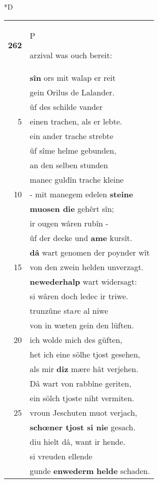 \documentclass[8pt,a4paper,notitlepage]{article}
\begin{document}
\begin{table}[ht]
\begin{minipage}[t]{0.5\linewidth}
\small
\begin{center}*D
\end{center}
\begin{tabular}{rl}
\textbf{262} & \begin{large}P\end{large}arzival was ouch bereit:\\ 
 & \textbf{sîn} ors mit walap er reit\\ 
 & gein Orilus de Lalander.\\ 
 & ûf des schilde vander\\ 
5 & einen trachen, als er lebte.\\ 
 & ein ander trache strebte\\ 
 & ûf sîme helme gebunden,\\ 
 & an den selben stunden\\ 
 & manec guldîn trache kleine\\ 
10 & - mit manegem edelen \textbf{steine}\\ 
 & \textbf{muosen die} gehêrt sîn;\\ 
 & ir ougen wâren rubîn -\\ 
 & ûf der decke und \textbf{ame} kursît.\\ 
 & \textbf{dâ} wart genomen der poynder wît\\ 
15 & von den zwein helden unverzagt.\\ 
 & \textbf{newederhalp} wart widersagt:\\ 
 & si wâren doch ledec ir triwe.\\ 
 & trunzûne sta\textit{r}c al niwe\\ 
 & von in wæten gein den lüften.\\ 
20 & ich wolde mich des güften,\\ 
 & het ich eine sölhe tjost gesehen,\\ 
 & als mir \textbf{diz} mære hât verjehen.\\ 
 & Dâ wart von rabbîne geriten,\\ 
 & ein sölch tjoste niht vermiten.\\ 
25 & vroun Jeschuten muot verjach,\\ 
 & \textbf{schœner tjost si nie} gesach.\\ 
 & diu hielt dâ, want ir hende.\\ 
 & si vreuden ellende\\ 
 & gunde \textbf{enwederm} \textbf{helde} schaden.\\ 

\end{tabular}
\end{minipage}
\end{table}
\end{document}

